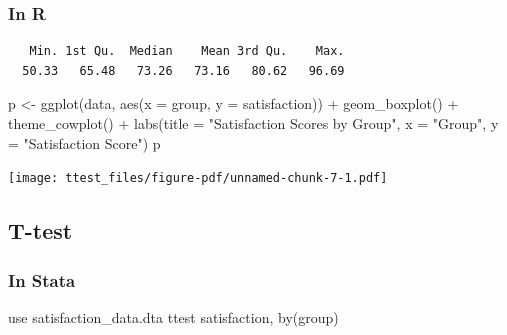 \documentclass[
  letterpaper,
  DIV=11,
  numbers=noendperiod]{scrreprt}
\newenvironment{Shaded}{\begin{snugshade}}{\end{snugshade}}
\newcommand{\AttributeTok}[1]{\textcolor[rgb]{0.40,0.45,0.13}{#1}}
\newcommand{\FunctionTok}[1]{\textcolor[rgb]{0.28,0.35,0.67}{#1}}
\newcommand{\KeywordTok}[1]{\textcolor[rgb]{0.00,0.23,0.31}{#1}}
\newcommand{\NormalTok}[1]{\textcolor[rgb]{0.00,0.23,0.31}{#1}}
\newcommand{\OtherTok}[1]{\textcolor[rgb]{0.00,0.23,0.31}{#1}}
\newcommand{\SpecialCharTok}[1]{\textcolor[rgb]{0.37,0.37,0.37}{#1}}
\newcommand{\StringTok}[1]{\textcolor[rgb]{0.13,0.47,0.30}{#1}}
\begin{document}
\subsubsection{In R}\label{in-r-1}

\begin{Shaded}
\end{Shaded}

\begin{verbatim}
   Min. 1st Qu.  Median    Mean 3rd Qu.    Max. 
  50.33   65.48   73.26   73.16   80.62   96.69 
\end{verbatim}

\begin{Shaded}
\begin{Highlighting}[]
\NormalTok{p }\OtherTok{\textless{}{-}} \FunctionTok{ggplot}\NormalTok{(data, }\FunctionTok{aes}\NormalTok{(}\AttributeTok{x =}\NormalTok{ group, }\AttributeTok{y =}\NormalTok{ satisfaction)) }\SpecialCharTok{+}
  \FunctionTok{geom\_boxplot}\NormalTok{() }\SpecialCharTok{+}
  \FunctionTok{theme\_cowplot}\NormalTok{() }\SpecialCharTok{+}
  \FunctionTok{labs}\NormalTok{(}\AttributeTok{title =} \StringTok{"Satisfaction Scores by Group"}\NormalTok{, }\AttributeTok{x =} \StringTok{"Group"}\NormalTok{, }\AttributeTok{y =} \StringTok{"Satisfaction Score"}\NormalTok{)}
\NormalTok{p}
\end{Highlighting}
\end{Shaded}

\texttt{[image: ttest\_files/figure-pdf/unnamed-chunk-7-1.pdf]}

\subsection{T-test}\label{t-test-1}

\subsubsection{In Stata}\label{in-stata-2}

\begin{Shaded}
\begin{Highlighting}[]
\KeywordTok{use}\NormalTok{ satisfaction\_data.dta}
\KeywordTok{ttest}\NormalTok{ satisfaction, }\KeywordTok{by}\NormalTok{(}\FunctionTok{group}\NormalTok{)}
\end{Highlighting}
\end{Shaded}
\end{document}
